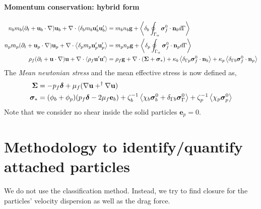 \documentclass[12pt]{My_preprint}
\begin{document}
\paragraph*{Momentum conservation: hybrid form}
\begin{align}
    n_b m_b (\pddt + \textbf{u}_b\cdot  \grad) \textbf{u}_b
    + \div \pavg[b]{ m_b \textbf{u}_b' \textbf{u}_b'}
    &= 
    m_b n_b \textbf{g}
    + \pSavg[b]{\bm\sigma_f^0 \cdot \textbf{n}_b}\\
    n_p m_p (\pddt + \textbf{u}_p\cdot  \grad) \textbf{u}_p
    + \div \pavg{ m_p \textbf{u}_p' \textbf{u}_p'}
    &= 
    m_p n_p \textbf{g}
    + \pSavg{\bm\sigma_f^0 \cdot \textbf{n}_p}\\
    \rho_f (\pddt + \textbf{u} \cdot \grad)\textbf{u}
    + \div \avg{\rho_f \textbf{u}' \textbf{u}'}
    &= 
    \rho_f \textbf{g}
    + \div (\bm\Sigma + \bm\sigma_*)
    +\kappa_b  \avg{\delta_{\Gamma p} \bm\sigma_f^0 \cdot \textbf{n}_b} 
    +\kappa_p  \avg{\delta_{\Gamma b}  \bm\sigma_f^0 \cdot \textbf{n}_p} 
\end{align}
The \textit{Mean newtonian stress} and the mean effective stress is now defined as, 
\begin{align}
    \bm\Sigma
    &=
    -p_f\bm\delta
    + \mu_f (\grad \textbf{u} + ^\dagger\grad \textbf{u})\\
    \bm\sigma_*
    &=
     (\phi_b + \phi_p) (p_f \bm\delta - 2 \mu_f \textbf{e}_b)
    +\zeta_b^{-1} \avg{\chi_b \bm\sigma_b^0 + \delta_{\Gamma b} \bm\sigma_\Gamma^0}  
    +\zeta_p^{-1} \avg{\chi_p \bm\sigma_p^0} 
\end{align}
Note that we consider no shear inside the solid particles $\textbf{e}_p = 0$. 

\section{Methodology to identify/quantify attached particles}

We do not use the classification method. 
Instead, we try to find closure for the particles' velocity dispersion as well as the drag force. 
\end{document}
